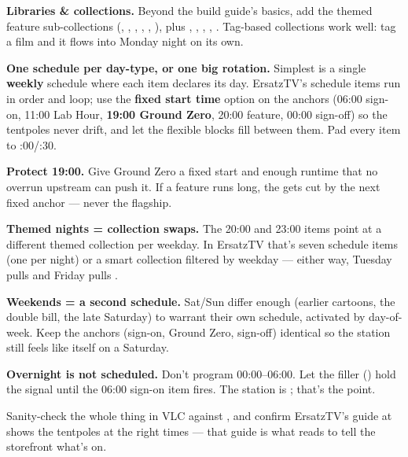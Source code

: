 \documentclass[fontpath=fonts/,logopath=logo/]{riposte-doc}
\begin{document}
\begin{ripnumbers}
\item \textbf{Libraries \& collections.} Beyond the build guide's basics, add the themed feature sub-collections (, , , , , ), plus , , , , . Tag-based collections work well: tag a film  and it flows into Monday night on its own.
\item \textbf{One schedule per day-type, or one big rotation.} Simplest is a single \textbf{weekly} schedule where each item declares its day. ErsatzTV's schedule items run in order and loop; use the \textbf{fixed start time} option on the anchors (06:00 sign-on, 11:00 Lab Hour, \textbf{19:00 Ground Zero}, 20:00 feature, 00:00 sign-off) so the tentpoles never drift, and let the flexible blocks fill between them. Pad every item to :00/:30.
\item \textbf{Protect 19:00.} Give Ground Zero a fixed start and enough runtime that no overrun upstream can push it. If a feature runs long, the  gets cut by the next fixed anchor — never the flagship.
\item \textbf{Themed nights = collection swaps.} The 20:00 and 23:00 items point at a different themed collection per weekday. In ErsatzTV that's seven schedule items (one per night) or a smart collection filtered by weekday — either way, Tuesday pulls  and Friday pulls .
\item \textbf{Weekends = a second schedule.} Sat/Sun differ enough (earlier cartoons, the double bill, the late Saturday) to warrant their own schedule, activated by day-of-week. Keep the anchors (sign-on, Ground Zero, sign-off) identical so the station still feels like itself on a Saturday.
\item \textbf{Overnight is not scheduled.} Don't program 00:00–06:00. Let the  filler () hold the signal until the 06:00 sign-on item fires. The station is ; that's the point.
\end{ripnumbers}

Sanity-check the whole thing in VLC against , and confirm ErsatzTV's guide at  shows the tentpoles at the right times — that guide is what  reads to tell the storefront what's on.
\end{document}
